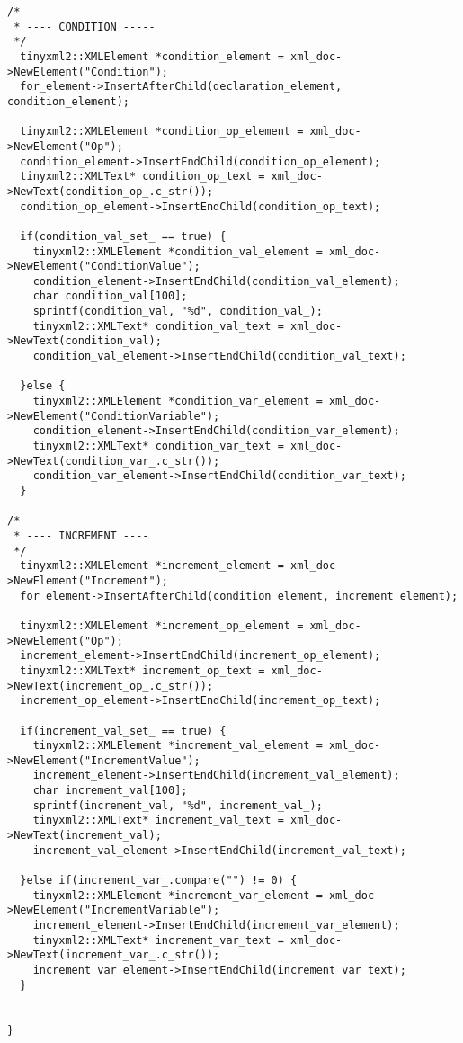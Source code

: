 \documentclass[a4paper,11pt,twoside]{book}
\begin{document}
\begin{lstlisting}[language=CCC, caption=pragma\_handler/ForNode.cpp]
/*
 * ---- CONDITION -----
 */ 
  tinyxml2::XMLElement *condition_element = xml_doc->NewElement("Condition");
  for_element->InsertAfterChild(declaration_element, condition_element); 
  
  tinyxml2::XMLElement *condition_op_element = xml_doc->NewElement("Op");
  condition_element->InsertEndChild(condition_op_element);
  tinyxml2::XMLText* condition_op_text = xml_doc->NewText(condition_op_.c_str());
  condition_op_element->InsertEndChild(condition_op_text);

  if(condition_val_set_ == true) {
    tinyxml2::XMLElement *condition_val_element = xml_doc->NewElement("ConditionValue");
    condition_element->InsertEndChild(condition_val_element);
    char condition_val[100];
    sprintf(condition_val, "%d", condition_val_);
    tinyxml2::XMLText* condition_val_text = xml_doc->NewText(condition_val);
    condition_val_element->InsertEndChild(condition_val_text);
  
  }else {
    tinyxml2::XMLElement *condition_var_element = xml_doc->NewElement("ConditionVariable");
    condition_element->InsertEndChild(condition_var_element);
    tinyxml2::XMLText* condition_var_text = xml_doc->NewText(condition_var_.c_str());
    condition_var_element->InsertEndChild(condition_var_text);
  }

/*
 * ---- INCREMENT ----
 */
  tinyxml2::XMLElement *increment_element = xml_doc->NewElement("Increment");
  for_element->InsertAfterChild(condition_element, increment_element); 

  tinyxml2::XMLElement *increment_op_element = xml_doc->NewElement("Op");
  increment_element->InsertEndChild(increment_op_element);
  tinyxml2::XMLText* increment_op_text = xml_doc->NewText(increment_op_.c_str());
  increment_op_element->InsertEndChild(increment_op_text);

  if(increment_val_set_ == true) {
    tinyxml2::XMLElement *increment_val_element = xml_doc->NewElement("IncrementValue");
    increment_element->InsertEndChild(increment_val_element);
    char increment_val[100];
    sprintf(increment_val, "%d", increment_val_);
    tinyxml2::XMLText* increment_val_text = xml_doc->NewText(increment_val);
    increment_val_element->InsertEndChild(increment_val_text);

  }else if(increment_var_.compare("") != 0) {
    tinyxml2::XMLElement *increment_var_element = xml_doc->NewElement("IncrementVariable");
    increment_element->InsertEndChild(increment_var_element);
    tinyxml2::XMLText* increment_var_text = xml_doc->NewText(increment_var_.c_str());
    increment_var_element->InsertEndChild(increment_var_text);
  }


}
\end{lstlisting}
\end{document}
